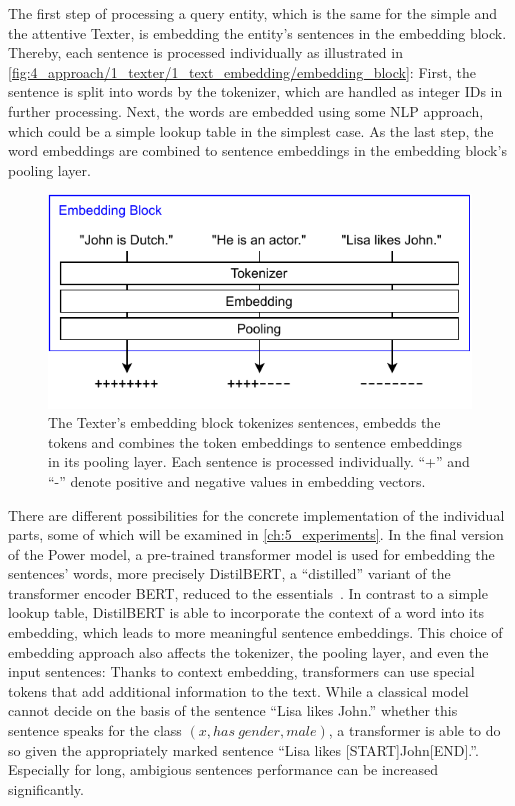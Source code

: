 The first step of processing a query entity, which is the same for the simple and the attentive Texter, is embedding the entity's sentences in the embedding block. Thereby, each sentence is processed individually as illustrated in \autoref{fig:4_approach/1_texter/1_text_embedding/embedding_block}: First, the sentence is split into words by the tokenizer, which are handled as integer IDs in further processing. Next, the words are embedded using some NLP approach, which could be a simple lookup table in the simplest case. As the last step, the word embeddings are combined to sentence embeddings in the embedding block's pooling layer.

\begin{figure}[t]
    \centering
    \includegraphics{4_approach/1_texter/1_text_embedding/embedding_block}
    \caption{The Texter's embedding block tokenizes sentences, embedds the tokens and combines the token embeddings to sentence embeddings in its pooling layer. Each sentence is processed individually. ``+'' and ``-'' denote positive and negative values in embedding vectors.}
    \label{fig:4_approach/1_texter/1_text_embedding/embedding_block}
\end{figure}

There are different possibilities for the concrete implementation of the individual parts, some of which will be examined in \autoref{ch:5_experiments}. In the final version of the Power model, a pre-trained transformer model is used for embedding the sentences' words, more precisely DistilBERT, a ``distilled'' variant of the transformer encoder BERT, reduced to the essentials~\cite{Sanh2019DistilBERTAD}. In contrast to a simple lookup table, DistilBERT is able to incorporate the context of a word into its embedding, which leads to more meaningful sentence embeddings. This choice of embedding approach also affects the tokenizer, the pooling layer, and even the input sentences: Thanks to context embedding, transformers can use special tokens that add additional information to the text. While a classical model cannot decide on the basis of the sentence ``Lisa likes John.'' whether this sentence speaks for the class $(x, has~gender, male)$, a transformer is able to do so given the appropriately marked sentence ``Lisa likes [START]John[END].''. Especially for long, ambigious sentences performance can be increased significantly.

